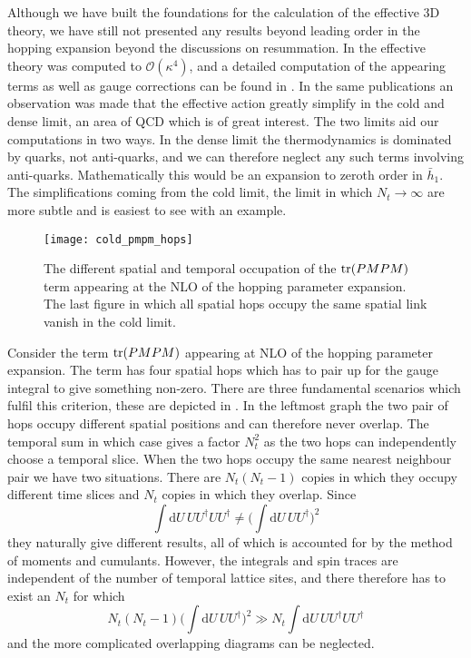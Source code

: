 Although we have built the foundations for the calculation of the effective 3D
theory, we have still not presented any results beyond leading order in the
hopping expansion beyond the discussions on resummation. In
\citep{Langelage:2014vpa} the effective theory was computed to
$\mathcal{O}(\kappa^4)$, and a detailed computation of the appearing terms as
well as gauge corrections can be found in \citep{Neuman:2015zb}. In the same
publications an observation was made that the effective action greatly simplify
in the cold and dense limit, an area of QCD which is of great interest. The two
limits aid our computations in two ways. In the dense limit the thermodynamics
is dominated by quarks, not anti-quarks, and we can therefore neglect any such
terms involving anti-quarks. Mathematically this would be an expansion to
zeroth order in $\bar{h}_1$. The simplifications coming from the cold limit, the
limit in which $N_t \to \infty$ are more subtle and is easiest to see with an
example.

\begin{figure}
  {\centering
    \texttt{[image: cold\_pmpm\_hops]}\par}
  \caption{The different spatial and temporal occupation of the $\operatorname{tr}(PMPM)$ term
    appearing at the NLO of the hopping parameter expansion. The last figure in
    which all spatial hops occupy the same spatial link vanish in the cold
    limit.}
  \label{fig-pmpm-hop-variants}
\end{figure}

Consider the term $\operatorname{tr}(PMPM)$ appearing at NLO of the hopping parameter
expansion. The term has four spatial hops which has to pair up for the gauge
integral to give something non-zero. There are three fundamental scenarios
which fulfil this criterion, these are depicted in .
In the leftmost graph the two pair of hops occupy different spatial positions
and can therefore never overlap. The temporal sum in which case gives a factor
$N_t^2$ as the two hops can independently choose a temporal slice. When the two
hops occupy the same nearest neighbour pair we have two situations. There are
$N_t(N_t-1)$ copies in which they occupy different time slices and $N_t$ copies
in which they overlap. Since
%
\begin{equation}
  \int \mathrm{d} U\, U U^{\dagger} U U^{\dagger} \neq
  \bigg(\int \mathrm{d} U\, U U^{\dagger} \bigg)^2
\end{equation}
%
they naturally give different results, all of which is accounted for by the
method of moments and cumulants. However, the integrals and spin traces are
independent of the number of temporal lattice sites, and there therefore has to
exist an $N_t$ for which
%
\begin{equation}
  N_t(N_t-1) \bigg( \int \mathrm{d} U \, U U^{\dagger} \bigg)^2 \gg
  N_t \int \mathrm{d} U \, U U^{\dagger} U U^{\dagger}
\end{equation}
%
and the more complicated overlapping diagrams can be neglected.

